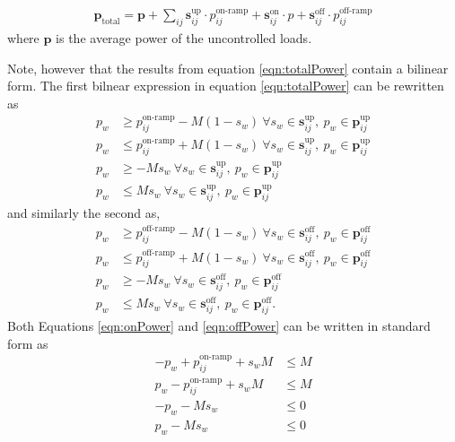 \begin{align}\label{eqn:totalPower}
	\mathbf{p}_{\text{total}} = \mathbf{p} + \sum_{ij} \mathbf{s}^{\text{up}}_{ij}\cdot p^{\text{on-ramp}}_{ij} + \mathbf{s}^{\text{on}}_{ij}\cdot p + \mathbf{s}^{\text{off}}_{ij}\cdot p^{\text{off-ramp}}_{ij}
\end{align}
where $\mathbf{p}$ is the average power of the uncontrolled loads.
\par Note, however that the results from equation \ref{eqn:totalPower} contain a bilinear form. The first bilnear expression in  equation \ref{eqn:totalPower} can be rewritten as 
\begin{equation} \label{eqn:onPower}\begin{aligned}
	p_w &\ge p^{\text{on-ramp}}_{ij} - M(1 - s_w) \ \forall s_w \in \mathbf{s}^{\text{up}}_{ij}, \ p_w \in \mathbf{p}_{ij}^{\text{up}}\\
	p_w &\le p^{\text{on-ramp}}_{ij} + M(1 - s_w) \ \forall s_w \in \mathbf{s}^{\text{up}}_{ij}, \ p_w \in \mathbf{p}_{ij}^{\text{up}}\\
	p_w &\ge -Ms_w \ \forall s_w \in \mathbf{s}^{\text{up}}_{ij}, \ p_w \in \mathbf{p}_{ij}^{\text{up}}\\
	p_w &\le Ms_w \ \forall s_w \in \mathbf{s}^{\text{up}}_{ij}, \ p_w \in \mathbf{p}_{ij}^{\text{up}}
\end{aligned} \end{equation}
and similarly the second as, 
\begin{equation} \label{eqn:offPower} \begin{aligned}
	p_w &\ge p^{\text{off-ramp}}_{ij} - M(1 - s_w) \ \forall s_w \in \mathbf{s}^{\text{off}}_{ij}, \ p_w \in \mathbf{p}_{ij}^{\text{off}}\\
		p_w &\le p^{\text{off-ramp}}_{ij} + M(1 - s_w) \ \forall s_w \in \mathbf{s}^{\text{off}}_{ij}, \ p_w \in \mathbf{p}_{ij}^{\text{off}}\\
		p_w &\ge -Ms_w \ \forall s_w \in \mathbf{s}^{\text{off}}_{ij}, \ p_w \in \mathbf{p}_{ij}^{\text{off}}\\
		p_w &\le Ms_w \ \forall s_w \in \mathbf{s}^{\text{off}}_{ij}, \ p_w \in \mathbf{p}_{ij}^{\text{off}}.
\end{aligned} \end{equation} 
Both Equations \ref{eqn:onPower} and \ref{eqn:offPower} can be written in standard form as
\begin{equation} \begin{aligned}
	-p_w + p_{ij}^{\text{on-ramp}} + s_wM &\le M \\
	p_w - p_{ij}^{\text{on-ramp}} + s_wM &\le M \\ 
	-p_w -Ms_w &\le 0 \\
	p_w -Ms_w &\le 0
\end{aligned} \end{equation} 
